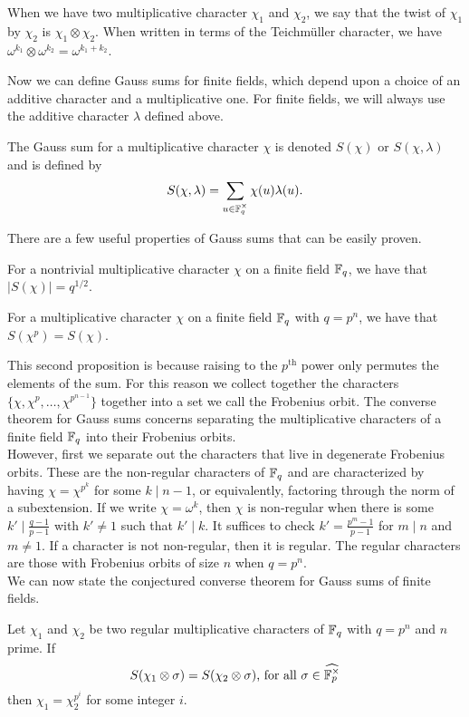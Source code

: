 When we have two multiplicative character $\chi_1$ and $\chi_2$, we say that the twist of $\chi_1$ by $\chi_2$ is $\chi_1 \otimes \chi_2$.
When written in terms of the Teichm\"uller character, we have $\omega^{k_1} \otimes \omega^{k_2} = \omega^{k_1+k_2}$.

Now we can define Gauss sums for finite fields, which depend upon a choice of an additive character and a multiplicative one. 
For finite fields, we will always use the additive character $\lambda$ defined above.
\begin{defn}\label{def:Gsum-FF}
The Gauss sum for a multiplicative character $\chi$ is denoted $S(\chi)$ or $S(\chi, \lambda)$ and is defined by \[S(\chi, \lambda) = \sum_{u \in \mathbb{F}_q^\times} \chi(u) \lambda(u).\]
\end{defn}
\noindent There are a few useful properties of Gauss sums that can be easily proven.
\begin{prop}
For a nontrivial multiplicative character $\chi$ on a finite field $\mathbb{F}_q$, we have that $|S(\chi)| = q^{1/2}$.
\end{prop}
\begin{prop}
For a multiplicative character $\chi$ on a finite field $\mathbb{F}_q$ with $q = p^n$, we have that $S(\chi^p) = S(\chi)$.
\end{prop}
This second proposition is because raising to the $p^\text{th}$ power only permutes the elements of the sum. 
For this reason we collect together the characters $\{\chi, \chi^{p}, \ldots, \chi^{p^{n-1}}\}$ together into a set we call the Frobenius orbit.
The converse theorem for Gauss sums concerns separating the multiplicative characters of a finite field $\mathbb{F}_q$ into their Frobenius orbits.\\

However, first we separate out the characters that live in degenerate Frobenius orbits. 
These are the non-regular characters of $\mathbb{F}_q$ and are characterized by having $\chi = \chi^{p^k}$ for some $k \mid n-1$, or equivalently, factoring through the norm of a subextension. 
If we write $\chi = \omega^k$, then $\chi$ is non-regular when there is some $k' \mid \frac{q-1}{p-1}$ with $k' \neq 1$ such that $k' \mid k$.
It suffices to check $k' = \frac{p^m - 1}{p-1}$ for $m \mid n$ and $m \neq 1$.
If a character is not non-regular, then it is regular. 
The regular characters are those with Frobenius orbits of size $n$ when $q = p^n$.\\

We can now state the conjectured converse theorem for Gauss sums of finite fields.
\begin{conj}[Nien]\label{conj:local-converse-FF}
  Let $\chi_1$ and $\chi_2$ be two regular multiplicative characters of $\mathbb{F}_q$ with $q = p^n$ and $n$ prime.
  If \[S(\chi_1 \otimes \sigma) = S(\chi_2 \otimes \sigma)\text{, for all } \sigma \in \widehat{\mathbb{F}_p^\times}\] then $\chi_1 = \chi_2^{p^i}$ for some integer $i$.
\end{conj}

